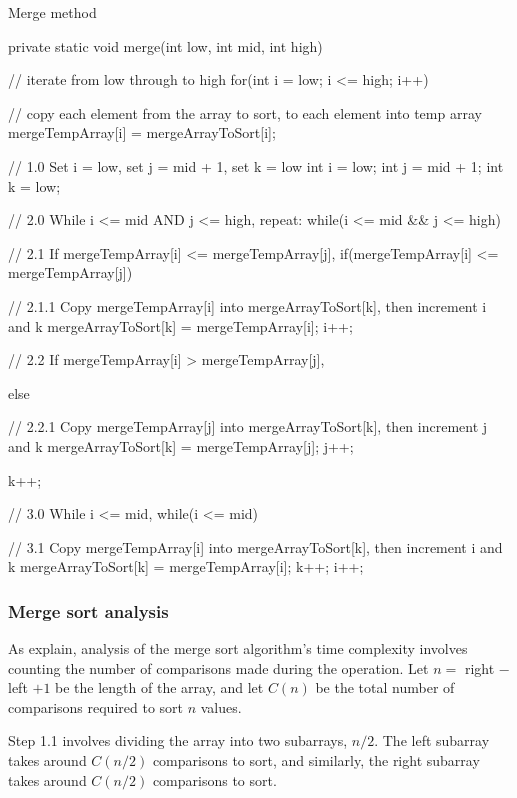 \begin{listing}[H]
\caption{Merge method}
\begin{javacode}
private static void merge(int low, int mid, int high) {

    // iterate from low through to high
    for(int i = low; i <= high; i++) {

        // copy each element from the array to sort, to each element into temp array
        mergeTempArray[i] = mergeArrayToSort[i];
    }

    // 1.0 Set i = low, set j = mid + 1, set k = low
    int i = low;
    int j = mid + 1;
    int k = low;

    // 2.0 While i <= mid AND j <= high, repeat:
    while(i <= mid && j <= high) {

        // 2.1 If mergeTempArray[i] <= mergeTempArray[j],
        if(mergeTempArray[i] <= mergeTempArray[j]) {

            // 2.1.1 Copy mergeTempArray[i] into mergeArrayToSort[k], then increment i and k
            mergeArrayToSort[k] = mergeTempArray[i];
            i++;

        // 2.2 If mergeTempArray[i] > mergeTempArray[j],
        } else {

            // 2.2.1 Copy mergeTempArray[j] into mergeArrayToSort[k], then increment j and k
            mergeArrayToSort[k] = mergeTempArray[j];
            j++;
        }
        k++;
    }

    // 3.0 While i <= mid,
    while(i <= mid) {

        // 3.1 Copy mergeTempArray[i] into mergeArrayToSort[k], then increment i and k
        mergeArrayToSort[k] = mergeTempArray[i];
        k++;
        i++;
    }
}
\end{javacode}
\end{listing}

\subsubsection{Merge sort analysis}

As \citet[p. 54 - 55]{Watt2001} explain, analysis of the merge sort algorithm's time complexity involves counting the number of comparisons made during the operation. Let $n =$ right $-$ left $+ 1$ be the length of the array, and let $C(n)$ be the total number of comparisons required to sort $n$ values.

Step 1.1 involves dividing the array into two subarrays, $n/2$. The left subarray takes around $C(n/2)$ comparisons to sort, and similarly, the right subarray takes around $C(n/2)$ comparisons to sort.

